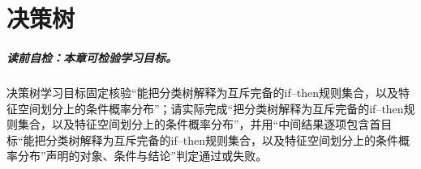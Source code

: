 
\chapter{决策树}\label{chap:V2-C04}


\label{struct:V2-C04-CH01}
\paragraph{读前自检：本章可检验学习目标。}决策树学习目标固定核验“能把分类树解释为互斥完备的if--then规则集合，以及特征空间划分上的条件概率分布”；请实际完成“把分类树解释为互斥完备的if--then规则集合，以及特征空间划分上的条件概率分布”，并用“中间结果逐项包含首目标“能把分类树解释为互斥完备的if--then规则集合，以及特征空间划分上的条件概率分布”声明的对象、条件与结论”判定通过或失败。\par

